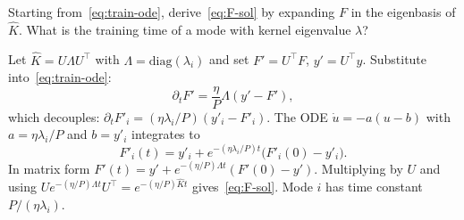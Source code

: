 \begin{exercise}
Starting from~\eqref{eq:train-ode}, derive~\eqref{eq:F-sol} by expanding $F$ in the eigenbasis of $\hat K$. What is the training time of a mode with kernel eigenvalue $\lambda$?
\end{exercise}
\begin{solution}
Let $\hat K=U\Lambda U^\top$ with $\Lambda=\mathrm{diag}(\lambda_i)$ and set $F'=U^\top F$, $y'=U^\top y$. Substitute into~\eqref{eq:train-ode}:
\[
  \partial_t F'
  =\frac{\eta}{P}\Lambda(y'-F'),
\]
which decouples: $\partial_t F'_i=(\eta\lambda_i/P)(y'_i-F'_i)$. The ODE $\dot u=-a(u-b)$ with $a=\eta\lambda_i/P$ and $b=y'_i$ integrates to
\[
  F'_i(t)=y'_i+e^{-(\eta\lambda_i/P)t}\bigl(F'_i(0)-y'_i\bigr).
\]
In matrix form $F'(t)=y'+e^{-(\eta/P)\Lambda t}(F'(0)-y')$. Multiplying by $U$ and using $U e^{-(\eta/P)\Lambda t}U^\top=e^{-(\eta/P)\hat K t}$ gives~\eqref{eq:F-sol}. Mode $i$ has time constant $P/(\eta\lambda_i)$.
\end{solution}
